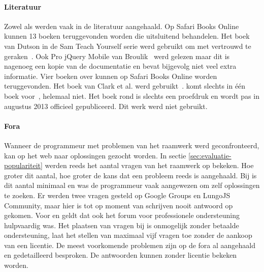 \paragraph{Literatuur}
Zowel \jqm{} als \st{} werden vaak in de literatuur aangehaald.
Op Safari Books Online kunnen 13 boeken teruggevonden worden die uitsluitend \jqm{} behandelen.
Het boek van Dutson in de Sam Teach Yourself serie werd gebruikt om met \jqm{} vertrouwd te geraken~\cite{PhilDutson2012}.
Ook Pro jQuery Mobile van Broulik~\cite{Broulik2012} werd gelezen maar dit is nagenoeg een kopie van de documentatie en bevat bijgevolg niet veel extra informatie.
Vier boeken over \st{} kunnen op Safari Books Online worden teruggevonden.
Het boek van Clark et al. werd gebruikt~\cite{JohnEClark2012}.
\kendo{} komt slechts in één boek voor~\cite{Bhandari2013},  \lungo{} helemaal niet.
Het boek rond \kendo{} is slechts een proefdruk en wordt pas in augustus 2013 officieel gepubliceerd.
Dit werk werd niet gebruikt.


\paragraph{Fora}
Wanneer de programmeur met problemen van het raamwerk werd geconfronteerd, kan op het web naar oplossingen gezocht worden.
In sectie \ref{sec:evaluatie-populariteit} werden reeds het aantal vragen van het raamwerk op \so{} bekeken.
Hoe groter dit aantal,  hoe groter de kans dat een probleem reeds is aangehaald.
Bij \lungo{} is dit aantal minimaal en was de programmeur vaak aangewezen om zelf oplossingen te zoeken.
Er werden twee vragen gesteld op Google Groups en LungoJS Community, maar hier is tot op moment van schrijven nooit antwoord op gekomen.
Voor \st{} en \kendo{} geldt dat ook het forum voor professionele ondersteuning hulpvaardig was.
Het plaatsen van vragen bij \st{} is onmogelijk zonder betaalde ondersteuning,  \kendo{} laat het stellen van maximaal vijf vragen toe zonder de aankoop van een licentie.
De meest voorkomende problemen zijn op de fora al aangehaald en gedetailleerd besproken.
De antwoorden kunnen zonder licentie bekeken worden.